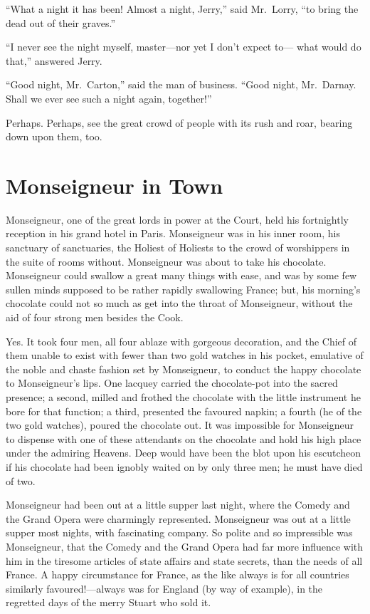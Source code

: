 ``What a night it has been!  Almost a night, Jerry,'' said Mr.\ Lorry,
``to bring the dead out of their graves.''

``I never see the night myself, master---nor yet I don't expect to---%
what would do that,'' answered Jerry.

``Good night, Mr.\ Carton,'' said the man of business.  ``Good night,
Mr.\ Darnay.  Shall we ever see such a night again, together!''

Perhaps.  Perhaps, see the great crowd of people with its rush and
roar, bearing down upon them, too.



\chapter{Monseigneur in Town}


Monseigneur, one of the great lords in power at the Court, held his
fortnightly reception in his grand hotel in Paris.  Monseigneur was
in his inner room, his sanctuary of sanctuaries, the Holiest of
Holiests to the crowd of worshippers in the suite of rooms without.
Monseigneur was about to take his chocolate.  Monseigneur could
swallow a great many things with ease, and was by some few sullen
minds supposed to be rather rapidly swallowing France; but, his
morning's chocolate could not so much as get into the throat of
Monseigneur, without the aid of four strong men besides the Cook.

Yes.  It took four men, all four ablaze with gorgeous decoration,
and the Chief of them unable to exist with fewer than two gold
watches in his pocket, emulative of the noble and chaste fashion set
by Monseigneur, to conduct the happy chocolate to Monseigneur's lips.
One lacquey carried the chocolate-pot into the sacred presence;
a second, milled and frothed the chocolate with the little instrument
he bore for that function; a third, presented the favoured napkin;
a fourth (he of the two gold watches), poured the chocolate out.
It was impossible for Monseigneur to dispense with one of these
attendants on the chocolate and hold his high place under the
admiring Heavens.  Deep would have been the blot upon his escutcheon
if his chocolate had been ignobly waited on by only three men; he
must have died of two.

Monseigneur had been out at a little supper last night, where the
Comedy and the Grand Opera were charmingly represented.  Monseigneur
was out at a little supper most nights, with fascinating company.
So polite and so impressible was Monseigneur, that the Comedy and
the Grand Opera had far more influence with him in the tiresome
articles of state affairs and state secrets, than the needs of all
France.  A happy circumstance for France, as the like always is for
all countries similarly favoured!---always was for England (by way of
example), in the regretted days of the merry Stuart who sold it.

